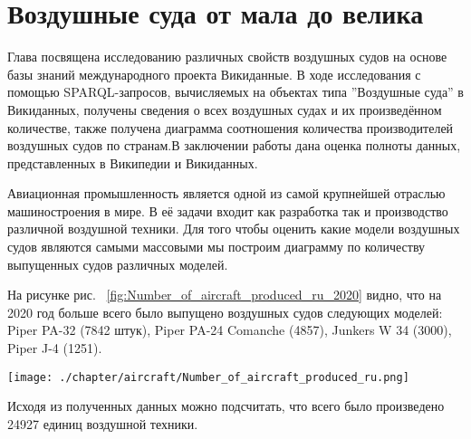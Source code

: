 \chapter{Воздушные суда от мала до велика}
\label{ch:aircraft-chapter}

Глава посвящена исследованию различных свойств воздушных судов на основе базы знаний международного проекта Викиданные. В ходе исследования с помощью SPARQL-запросов, вычисляемых на объектах типа ”Воздушные суда” в Викиданных, получены сведения о всех воздушных судах и их произведённом количестве, также получена диаграмма соотношения количества производителей воздушных судов по странам.В заключении работы дана оценка полноты данных, представленных в Википедии и Викиданных.

Авиационная промышленность является одной из самой крупнейшей отраслью машиностроения в мире. В её задачи входит как разработка так и производство различной воздушной техники. Для того чтобы оценить какие модели воздушных судов являются самыми массовыми мы построим диаграмму по количеству выпущенных судов различных моделей.

На рисунке рис. ~\ref{fig:Number_of_aircraft_produced_ru_2020} видно, что на 2020 год больше всего было выпущено воздушных судов следующих моделей: Piper PA-32 (7842 штук), Piper PA-24 Comanche (4857), Junkers W 34 (3000), Piper J-4 (1251).



\begin{figure*}[h!]
	\texttt{[image: ./chapter/aircraft/Number\_of\_aircraft\_produced\_ru.png]}
	\caption{Количество выпущенных воздушных судов по моделям, 2020.}
	\label{fig:Number_of_aircraft_produced_ru_2020}
\end{figure*}

Исходя из полученных данных можно подсчитать, что всего было произведено 24927 единиц воздушной техники.
